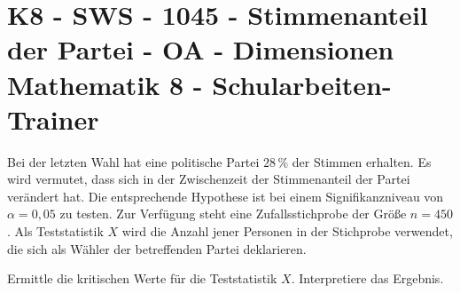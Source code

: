 \section{K8 - SWS - 1045 - Stimmenanteil der Partei - OA - Dimensionen Mathematik 8 - Schularbeiten-Trainer}

\begin{beispiel}[K8 - SWS]{1}
Bei der letzten Wahl hat eine politische Partei $28\,\%$ der Stimmen erhalten. Es wird vermutet, dass sich in der Zwischenzeit der Stimmenanteil der Partei verändert hat. Die entsprechende Hypothese ist bei einem Signifikanzniveau von $\alpha=0,05$ zu testen. Zur Verfügung steht eine Zufallsstichprobe der Größe $n=450$. Als Teststatistik $X$ wird die Anzahl jener Personen in der Stichprobe verwendet, die sich als Wähler der betreffenden Partei deklarieren.

Ermittle die kritischen Werte für die Teststatistik $X$. Interpretiere das Ergebnis.

\end{beispiel}